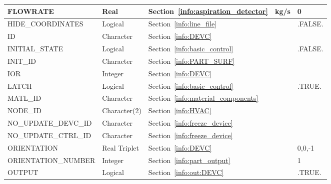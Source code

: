 \documentclass[11pt]{book}
\begin{document}
\begin{longtable}{@{\extracolsep{\fill}}|l|l|l|l|l|}
{\ct FLOWRATE}              & Real            & Section~\ref{info:aspiration_detector}                          & kg/s  & 0             \\ \hline
{\ct HIDE\_COORDINATES}     & Logical         & Section~\ref{info:line_file}                                    &       & {\ct .FALSE.} \\ \hline
{\ct ID}                    & Character       & Section~\ref{info:DEVC}                                         &       &               \\ \hline
{\ct INITIAL\_STATE}        & Logical         & Section~\ref{info:basic_control}                                &       & {\ct .FALSE.} \\ \hline
{\ct INIT\_ID}              & Character       & Section~\ref{info:PART_SURF}                                    &       &               \\ \hline
{\ct IOR}                   & Integer         & Section~\ref{info:DEVC}                                         &       &               \\ \hline
{\ct LATCH}                 & Logical         & Section~\ref{info:basic_control}                                &       & {\ct .TRUE.}  \\ \hline
{\ct MATL\_ID}              & Character       & Section~\ref{info:material_components}                          &       &               \\ \hline
{\ct NODE\_ID}              & Character(2)    & Section~\ref{info:HVAC}                                         &       &               \\ \hline
{\ct NO\_UPDATE\_DEVC\_ID}  & Character       & Section~\ref{info:freeze_device}                                &       &               \\ \hline
{\ct NO\_UPDATE\_CTRL\_ID}  & Character       & Section~\ref{info:freeze_device}                                &       &               \\ \hline
{\ct ORIENTATION}           & Real Triplet    & Section~\ref{info:DEVC}                                         &       & 0,0,-1        \\ \hline
{\ct ORIENTATION\_NUMBER}   & Integer         & Section~\ref{info:part_output}                                  &       & 1             \\ \hline
{\ct OUTPUT}                & Logical         & Section~\ref{info:out:DEVC}                                     &       & {\ct .TRUE.}  \\ \hline

\end{longtable}
\end{document}
